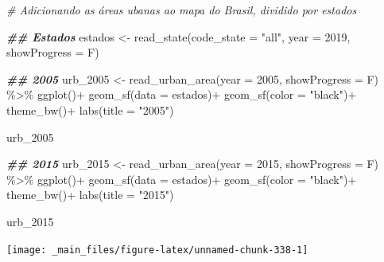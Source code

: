 \documentclass[
  brazilian,
]{book}
\newenvironment{Shaded}{\begin{snugshade}}{\end{snugshade}}
\newcommand{\AttributeTok}[1]{\textcolor[rgb]{0.77,0.63,0.00}{#1}}
\newcommand{\CommentTok}[1]{\textcolor[rgb]{0.56,0.35,0.01}{\textit{#1}}}
\newcommand{\DecValTok}[1]{\textcolor[rgb]{0.00,0.00,0.81}{#1}}
\newcommand{\DocumentationTok}[1]{\textcolor[rgb]{0.56,0.35,0.01}{\textbf{\textit{#1}}}}
\newcommand{\FunctionTok}[1]{\textcolor[rgb]{0.00,0.00,0.00}{#1}}
\newcommand{\NormalTok}[1]{#1}
\newcommand{\OtherTok}[1]{\textcolor[rgb]{0.56,0.35,0.01}{#1}}
\newcommand{\SpecialCharTok}[1]{\textcolor[rgb]{0.00,0.00,0.00}{#1}}
\newcommand{\StringTok}[1]{\textcolor[rgb]{0.31,0.60,0.02}{#1}}
\begin{document}
\begin{Shaded}
\begin{Highlighting}[]
\CommentTok{\# Adicionando as áreas ubanas ao mapa do Brasil, dividido por estados}

\DocumentationTok{\#\# Estados}
\NormalTok{estados }\OtherTok{\textless{}{-}} \FunctionTok{read\_state}\NormalTok{(}\AttributeTok{code\_state =} \StringTok{"all"}\NormalTok{,}
                      \AttributeTok{year =} \DecValTok{2019}\NormalTok{,}
                      \AttributeTok{showProgress =}\NormalTok{ F)}

\DocumentationTok{\#\# 2005}
\NormalTok{urb\_2005 }\OtherTok{\textless{}{-}} \FunctionTok{read\_urban\_area}\NormalTok{(}\AttributeTok{year =} \DecValTok{2005}\NormalTok{,}
                            \AttributeTok{showProgress =}\NormalTok{ F) }\SpecialCharTok{\%\textgreater{}\%} 
  \FunctionTok{ggplot}\NormalTok{()}\SpecialCharTok{+}
  \FunctionTok{geom\_sf}\NormalTok{(}\AttributeTok{data =}\NormalTok{ estados)}\SpecialCharTok{+}
  \FunctionTok{geom\_sf}\NormalTok{(}\AttributeTok{color =} \StringTok{"black"}\NormalTok{)}\SpecialCharTok{+}
  \FunctionTok{theme\_bw}\NormalTok{()}\SpecialCharTok{+}
  \FunctionTok{labs}\NormalTok{(}\AttributeTok{title =} \StringTok{"2005"}\NormalTok{)}

\NormalTok{urb\_2005}
\end{Highlighting}
\end{Shaded}

\begin{Shaded}
\begin{Highlighting}[]
\DocumentationTok{\#\# 2015}
\NormalTok{urb\_2015 }\OtherTok{\textless{}{-}} \FunctionTok{read\_urban\_area}\NormalTok{(}\AttributeTok{year =} \DecValTok{2015}\NormalTok{,}
                            \AttributeTok{showProgress =}\NormalTok{ F) }\SpecialCharTok{\%\textgreater{}\%} 
  \FunctionTok{ggplot}\NormalTok{()}\SpecialCharTok{+}
  \FunctionTok{geom\_sf}\NormalTok{(}\AttributeTok{data =}\NormalTok{ estados)}\SpecialCharTok{+}
  \FunctionTok{geom\_sf}\NormalTok{(}\AttributeTok{color =} \StringTok{"black"}\NormalTok{)}\SpecialCharTok{+}
  \FunctionTok{theme\_bw}\NormalTok{()}\SpecialCharTok{+}
  \FunctionTok{labs}\NormalTok{(}\AttributeTok{title =} \StringTok{"2015"}\NormalTok{)}

\NormalTok{urb\_2015}
\end{Highlighting}
\end{Shaded}

\begin{center}\texttt{[image: \_main\_files/figure-latex/unnamed-chunk-338-1]} \end{center}
\end{document}
